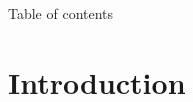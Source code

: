 \documentclass{beamer}
\begin{document}
    





\begin{frame}{Table of contents}
  \tableofcontents
\end{frame}









\section{Introduction}
\end{document}
